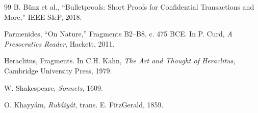 \documentclass[12pt,a4paper]{article}
\theoremstyle{philosophical}
\begin{document}
\begin{thebibliography}{99}
 B. B\"unz et al., ``Bulletproofs: Short Proofs for Confidential Transactions and More,'' IEEE S\&P, 2018.

 Parmenides, ``On Nature,'' Fragments B2--B8, c. 475 BCE. In P. Curd, \textit{A Presocratics Reader}, Hackett, 2011.

 Heraclitus, Fragments. In C.H. Kahn, \textit{The Art and Thought of Heraclitus}, Cambridge University Press, 1979.

 W. Shakespeare, \textit{Sonnets}, 1609.

 O. Khayy\'am, \textit{Rub\'aiy\'at}, trans. E. FitzGerald, 1859.

\end{thebibliography}
\end{document}
